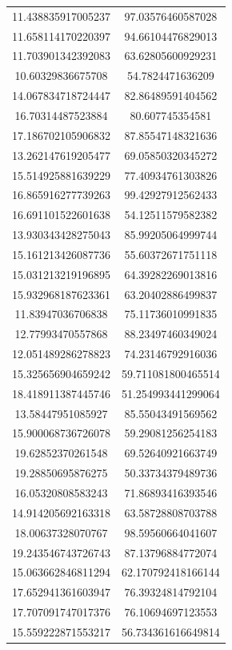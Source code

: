 \begin{table}
\begin{tabular}{cc}
11.438835917005237 & 97.03576460587028 \\
11.658114170220397 & 94.66104476829013 \\
11.703901342392083 & 63.62805600929231 \\
10.60329836675708 & 54.7824471636209 \\
14.067834718724447 & 82.86489591404562 \\
16.70314487523884 & 80.607745354581 \\
17.186702105906832 & 87.85547148321636 \\
13.262147619205477 & 69.05850320345272 \\
15.514925881639229 & 77.40934761303826 \\
16.865916277739263 & 99.42927912562433 \\
16.691101522601638 & 54.12511579582382 \\
13.930343428275043 & 85.99205064999744 \\
15.161213426087736 & 55.60372671751118 \\
15.031213219196895 & 64.39282269013816 \\
15.932968187623361 & 63.20402886499837 \\
11.83947036706838 & 75.11736010991835 \\
12.77993470557868 & 88.23497460349024 \\
12.051489286278823 & 74.23146792916036 \\
15.325656904659242 & 59.711081800465514 \\
18.418911387445746 & 51.254993441299064 \\
13.58447951085927 & 85.55043491569562 \\
15.900068736726078 & 59.29081256254183 \\
19.62852370261548 & 69.52640921663749 \\
19.28850695876275 & 50.33734379489736 \\
16.05320808583243 & 71.86893416393546 \\
14.914205692163318 & 63.58728808703788 \\
18.00637328070767 & 98.59560664041607 \\
19.243546743726743 & 87.13796884772074 \\
15.063662846811294 & 62.170792418166144 \\
17.652941361603947 & 76.39324814792104 \\
17.707091747017376 & 76.10694697123553 \\
15.559222871553217 & 56.734361616649814 \\

\end{tabular}
\end{table}
